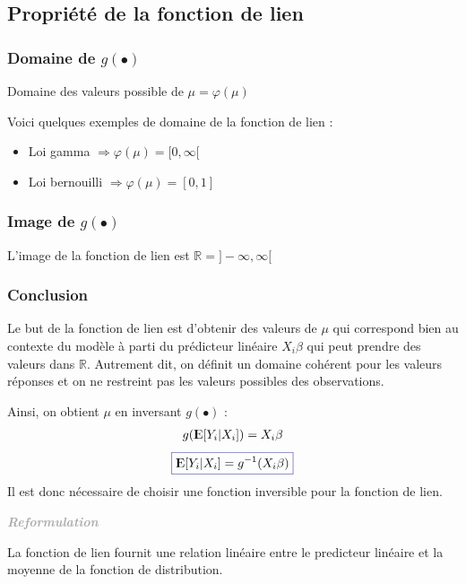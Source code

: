 \documentclass[11pt,french]{report}
\newcommand{\E}{{\rm I\kern-.3em E}}
\newenvironment{moreInfo}[1]
	{\begin{mdframed}
	\textcolor{darkgray}{\huge \raisebox{-3.5pt}{\faInfo} 
	\hspace{0.5cm} \large\bfseries #1}\\[5pt]
	\normalsize
	\makebox[0.1\textwidth][l]{}	
	\begin{minipage}{10cm}}
	{	\end{minipage}
	\end{mdframed}}
\begin{document}
\subsection{Propriété de la fonction de lien}
\subsubsection{Domaine de $g(\bullet)$}
Domaine des valeurs possible de $\mu = \varphi(\mu)$ \newline

Voici quelques exemples de domaine de la fonction de lien :
\begin{itemize}
\item Loi gamma $\Rightarrow \varphi(\mu) = [0, \infty[$
\item Loi bernouilli $\Rightarrow \varphi(\mu) = [0, 1]$
\end{itemize}

\subsubsection{Image de $g(\bullet)$}
L'image de la fonction de lien est $\mathbb{R} = ] - \infty, \infty [$

\subsubsection{Conclusion}
Le but de la fonction de lien est d'obtenir des valeurs de $\mu$ qui correspond bien au contexte du modèle à parti du prédicteur linéaire $X_i\beta$ qui peut prendre des valeurs dans $\mathbb{R}$. Autrement dit, on définit un domaine cohérent pour les valeurs réponses et on ne restreint pas les valeurs possibles des observations.\newline

Ainsi, on obtient $\mu$ en inversant $g(\bullet)$ :
\begin{align*}
g(\E[Y_i|X_i]) &= X_i\beta \\
\end{align*}
\begin{equation}
\label{eq:fonctionlien}
\color{Blue}
\boxed{\color{black}
\E[Y_i|X_i] = g^{-1}(X_i\beta)
}
\end{equation}
Il est donc nécessaire de choisir une fonction inversible pour la fonction de lien.

\begin{moreInfo}{\color{Gray}\emph{Reformulation}
     \color{black}}
     La fonction de lien fournit une relation linéaire entre le predicteur linéaire et la moyenne de la fonction de distribution. 
\end{moreInfo}
\end{document}
